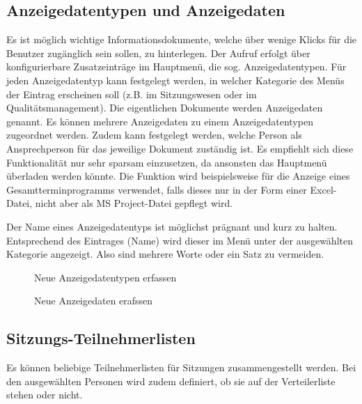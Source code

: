 \subsection{Anzeigedatentypen und Anzeigedaten}

Es ist möglich wichtige Informationsdokumente, welche über wenige Klicks für die Benutzer zugänglich sein sollen, zu hinterlegen. Der Aufruf erfolgt über konfigurierbare Zusatzeinträge im Hauptmenü, die sog. Anzeigedatentypen. Für jeden Anzeigedatentyp kann festgelegt werden, in welcher Kategorie des Menüs der Eintrag erscheinen soll (z.B. im Sitzungswesen oder im Qualitätsmanagement). Die eigentlichen Dokumente werden Anzeigedaten genannt. Es können mehrere Anzeigedaten zu einem Anzeigedatentypen zugeordnet werden. Zudem kann festgelegt werden, welche Person als Ansprechperson für das jeweilige Dokument zuständig ist. Es empfiehlt sich diese Funktionalität nur sehr sparsam einzusetzen, da ansonsten das Hauptmenü überladen werden könnte. Die Funktion wird beispielsweise für die Anzeige eines Gesamtterminprogramms verwendet, falls dieses nur in der Form einer Excel-Datei, nicht aber als MS Project-Datei gepflegt wird.

\vspace{\baselineskip}

Der Name eines Anzeigedatentyps ist möglichst prägnant und kurz zu halten. Entsprechend des Eintrages (Name) wird dieser im Menü unter der ausgewählten Kategorie angezeigt. Also sind mehrere Worte oder ein Satz zu vermeiden.

\begin{figure}[H]
\caption{Neue Anzeigedatentypen erfassen}
\end{figure}

\begin{figure}[H]
\caption{Neue Anzeigedaten erafssen}
\end{figure}


\subsection{Sitzungs-Teilnehmerlisten}

Es können beliebige Teilnehmerlisten für Sitzungen zusammengestellt werden. Bei den ausgewählten Personen wird zudem definiert, ob sie auf der Verteilerliste stehen oder nicht.

